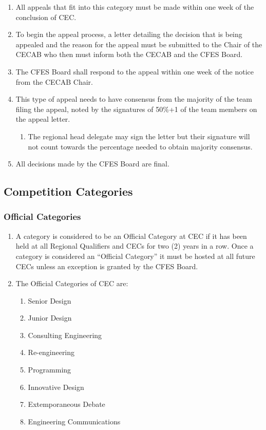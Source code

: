 \begin{enumerate}
 \item
  All appeals that fit into this category must be made within one week of the conclusion of CEC.
 \item
  To begin the appeal process, a letter detailing the decision that is being appealed and the reason for the appeal must be submitted to the Chair of the CECAB who then must inform both the CECAB and the CFES Board.
 \item
  The CFES Board shall respond to the appeal within one week of the notice from the CECAB Chair.
 \item
  This type of appeal needs to have consensus from the majority of the team filing the appeal, noted by the signatures of 50\%+1 of the team members on the appeal letter.

  \begin{enumerate}
   \item
    The regional head delegate may sign the letter but their signature will not count towards the percentage needed to obtain majority consensus.
  \end{enumerate}

 \item
  All decisions made by the CFES Board are final.
\end{enumerate}

\subsection{Competition Categories}
\label{competition-categories}

\subsubsection{Official Categories}
\label{official-categories}

\begin{enumerate}
 \item
  A category is considered to be an Official Category at CEC if it has been held at all Regional Qualifiers and CECs for two (2) years in a row. Once a category is considered an “Official Category” it must be hosted at all future CECs unless an exception is granted by the CFES Board.
 \item
  The Official Categories of CEC are:

  \begin{enumerate}
   \item
    Senior Design
   \item
    Junior Design
   \item
    Consulting Engineering
   \item
    Re-engineering
   \item
    Programming
   \item
    Innovative Design
   \item
    Extemporaneous Debate
   \item
    Engineering Communications
  \end{enumerate}

\end{enumerate}

